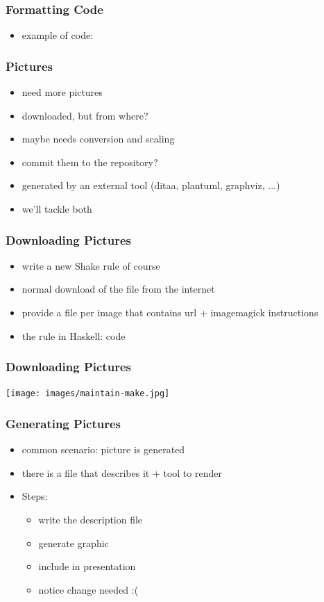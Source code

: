\documentclass{beamer}
\begin{document}
\begin{frame}
  \frametitle{Formatting Code}
  \begin{itemize}
  \item example of code:
  \end{itemize}
\end{frame}

\begin{frame}
  \frametitle{Pictures}
  \begin{itemize}
  \item need more pictures
  \item downloaded, but from where?
  \item maybe needs conversion and scaling
  \item commit them to the repository?
  \item generated by an external tool (ditaa, plantuml, graphviz, ...)
  \item we'll tackle both
  \end{itemize}
\end{frame}

\begin{frame}
  \frametitle{Downloading Pictures}
  \begin{itemize}
  \item write a new Shake rule of course
  \item normal download of the file from the internet
  \item provide a file per image that contains url + imagemagick instructions
  \item the rule in Haskell: code
  \end{itemize}
\end{frame}

\begin{frame}
  \frametitle{Downloading Pictures}
  \texttt{[image: images/maintain-make.jpg]}
\end{frame}

\begin{frame}
  \frametitle{Generating Pictures}
  \begin{itemize}
  \item common scenario: picture is generated
  \item there is a file that describes it + tool to render
  \item Steps:
    \begin{itemize}
    \item write the description file
    \item generate graphic
    \item include in presentation
    \item notice change needed :(
    \end{itemize}
  \end{itemize}
\end{frame}
\end{document}
